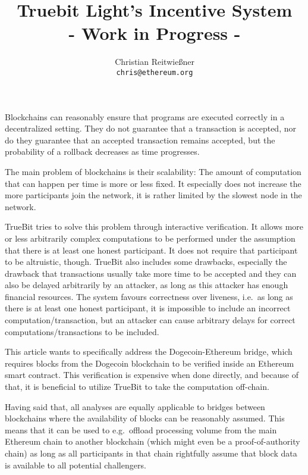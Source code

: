 \documentclass[11pt,letterpaper]{article}
\date{}
\begin{document}


\title{Truebit Light's Incentive System\\ - Work in Progress -}

\author{Christian Reitwießner \\ 
{\tt chris@ethereum.org}}


\maketitle



Blockchains can reasonably ensure that programs are executed correctly in a decentralized setting.
They do not guarantee that a transaction is accepted, nor do they guarantee that an accepted transaction remains
accepted, but the probability of a rollback decreases as time progresses.

The main problem of blockchains is their scalability: The amount of computation that can happen per time is more or less fixed.
It especially does not increase the more participants join the network, it is rather limited by the slowest node in the
network.

TrueBit tries to solve this problem through interactive verification. It allows more or less arbitrarily complex computations to
be performed under the assumption that there is at least one honest participant. It does not require that participant
to be altruistic, though. TrueBit also includes some drawbacks, especially the drawback that transactions usually take
more time to be accepted and they can also be delayed arbitrarily by an attacker, as long as this attacker has enough
financial resources. The system favours correctness over liveness, i.e.\ as long as there is at least one honest
participant, it is impossible to include an incorrect computation/transaction, but an attacker can cause arbitrary delays for
correct computations/transactions to be included.

This article wants to specifically address the Dogecoin-Ethereum bridge, which requires blocks from the Dogecoin
blockchain to be verified inside an Ethereum smart contract. This verification is expensive when done directly,
and because of that, it is beneficial to utilize TrueBit to take the computation off-chain.

Having said that, all analyses are equally applicable to bridges between blockchains where the availability of blocks
can be reasonably assumed. This means that it can be used to e.g.\ offload processing volume from the main Ethereum
chain to another blockchain (which might even be a proof-of-authority chain) as long as all participants in that chain
rightfully assume that block data is available to all potential challengers.
\end{document}
